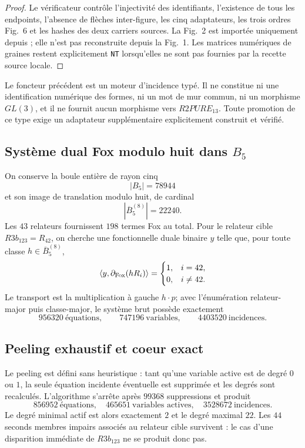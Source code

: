\begin{proof}
Le vérificateur  contrôle l'injectivité des identifiants, l'existence de tous les endpoints, l'absence de flèches inter-figure, les cinq adaptateurs, les trois ordres Fig.~6 et les hashes des deux carriers sources. La Fig.~2 est importée uniquement depuis ; elle n'est pas reconstruite depuis la Fig.~1. Les matrices numériques de graines restent explicitement \texttt{NT} lorsqu'elles ne sont pas fournies par la recette source locale.
\end{proof}

\begin{guardrail}
Le foncteur précédent est un moteur d'incidence typé. Il ne constitue ni une identification numérique des formes, ni un mot de mur commun, ni un morphisme $GL(3)$, et il ne fournit aucun morphisme vers $R2PURE_{13}$. Toute promotion de ce type exige un adaptateur supplémentaire explicitement construit et vérifié.
\end{guardrail}

\subsection{Système dual Fox modulo huit dans $B_5$}

On conserve la boule entière de rayon cinq
\[
 |B_5|=78944
\]
et son image de translation modulo huit, de cardinal
\[
 |\overline B_5^{(8)}|=22240.
\]
Les $43$ relateurs fournissent $198$ termes Fox au total. Pour le relateur cible $R3b_{123}=R_{42}$, on cherche une fonctionnelle duale binaire $y$ telle que, pour toute classe $h\in\overline B_5^{(8)}$,
\[
 \langle y,\partial_{\rm Fox}(hR_i)\rangle
 =\begin{cases}
 1,&i=42,\\
 0,&i\ne42.
 \end{cases}
\]
Le transport est la multiplication à gauche $h\cdot p$; avec l'énumération relateur-major puis classe-major, le système brut possède exactement
\[
 \boxed{
 956320\ \text{équations},\qquad
 747196\ \text{variables},\qquad
 4403520\ \text{incidences}.}
\]

\subsection{Peeling exhaustif et coeur exact}

Le peeling est défini sans heuristique : tant qu'une variable active est de degré $0$ ou $1$, la seule équation incidente éventuelle est supprimée et les degrés sont recalculés. L'algorithme s'arrête après $99368$ suppressions et produit
\[
 \boxed{
 856952\ \text{équations},\quad
 465651\ \text{variables actives},\quad
 3528672\ \text{incidences}.}
\]
Le degré minimal actif est alors exactement $2$ et le degré maximal $22$. Les $44$ seconds membres impairs associés au relateur cible survivent : le cas d'une disparition immédiate de $R3b_{123}$ ne se produit donc pas.

